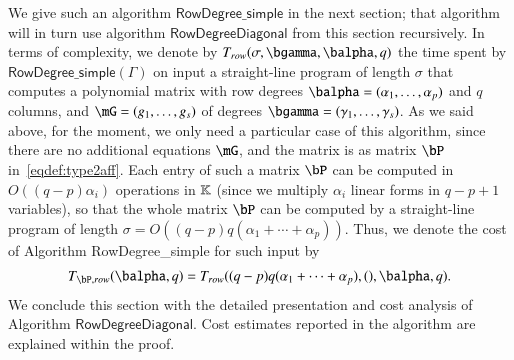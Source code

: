 \documentclass[amsthm]{elsart}
\begin{document}
We give such an algorithm $\mathsf{RowDegree\_simple}$ in the next section;
that algorithm will in turn use algorithm $\mathsf{RowDegreeDiagonal}$
from this section recursively. In terms of complexity, we denote by
$T_{\rm row}(\sigma,\bgamma,\balpha,q)$ the time spent by
$\mathsf{RowDegree\_simple}(\Gamma)$ on input a straight-line program
of length $\sigma$ that computes a polynomial matrix with row degrees
$\balpha=(\alpha_1,\dots,\alpha_p)$ and $q$ columns, and
$\mG=(g_1,\dots,g_s)$ of degrees $\bgamma=(\gamma_1,\dots,\gamma_s)$.
As we said above, for the moment, we only need a particular case of
this algorithm, since there are no additional equations $\mG$, and the
matrix is as matrix $\bP$ in~\eqref{eqdef:type2aff}. Each entry of
such a matrix $\bP$ can be computed in $O((q-p) \alpha_i)$ operations
in $\mathbb{K}$ (since we multiply $\alpha_i$ linear forms in $q-p+1$
variables), so that the whole matrix $\bP$ can be computed by a
straight-line program of length
$\sigma=O((q-p)q(\alpha_1+\cdots+\alpha_p))$. Thus, we denote the cost
of Algorithm {\sf RowDegree\_simple} for such input by
\begin{align}
T_{\bP,{\rm row}}(\balpha,q)=T_{\rm row}((q-p)q(\alpha_1+\cdots+\alpha_p),(),\balpha,q).
\end{align}
We conclude this section with the detailed presentation and cost 
analysis of Algorithm $\mathsf{RowDegreeDiagonal}$. Cost estimates reported in the 
algorithm are explained within the proof. 
\end{document}
